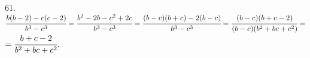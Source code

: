 61. $\cfrac{b(b-2)-c(c-2)}{b^3-c^3}=\cfrac{b^2-2b-c^2+2c}{b^3-c^3}=\cfrac{(b-c)(b+c)-2(b-c)}{b^3-c^3}=\cfrac{(b-c)(b+c-2)}{(b-c)(b^2+bc+c^2)}=$\\$=\cfrac{b+c-2}{b^2+bc+c^2}.$\\
